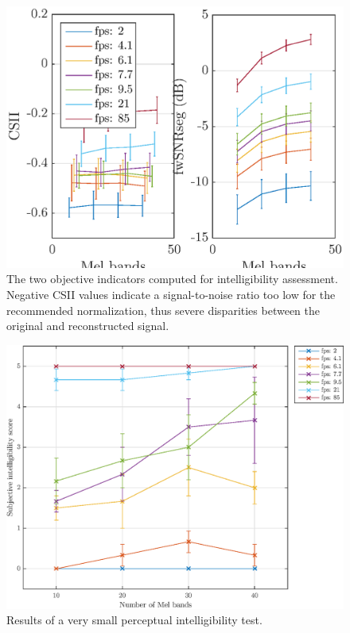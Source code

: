 \documentclass[final,3p,times,twocolumn]{elsarticle}
\begin{document}
\begin{figure}[htbp]
	\centering
		\includegraphics[width=\columnwidth]{int_mel_avg.eps}
	\caption{The two objective indicators computed for intelligibility assessment. Negative CSII values indicate a signal-to-noise ratio too low for the recommended normalization, thus severe disparities between the original and reconstructed signal.}
	\label{fig:int_mel_avg}
\end{figure}

\begin{figure}[htbp]
	\centering
		\includegraphics[width=\columnwidth]{percint_mel_avg.eps}
	\caption{Results of a very small perceptual intelligibility test.}
	\label{fig:percint_mel_avg}
\end{figure}
\end{document}
